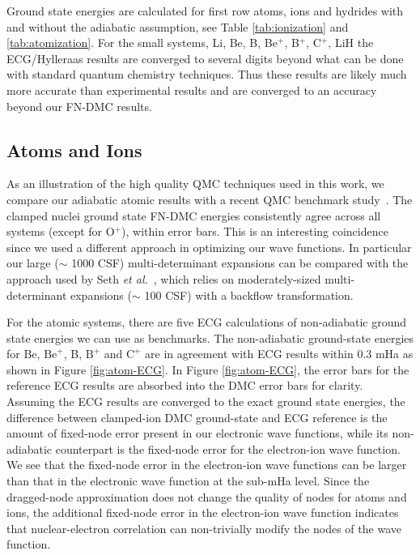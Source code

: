 \documentclass[pra,superscriptaddress,groupedaddress,twocolumn]{revtex4}
\begin{document}
Ground state energies are calculated for first row atoms, ions and hydrides with and without the adiabatic assumption, see Table \ref{tab:ionization} and \ref{tab:atomization}. For the small systems, Li, Be, B, Be$^+$, B$^+$, C$^+$, LiH the ECG/Hylleraas results are converged to several digits beyond what can be done with standard quantum chemistry techniques. Thus these results are likely much more accurate than experimental results and are converged to an accuracy beyond our FN-DMC results.

\subsection{Atoms and Ions}

As an illustration of the high quality QMC techniques used in this work, we compare our adiabatic atomic results with a recent QMC benchmark study~\cite{Seth_Bench}. The clamped nuclei ground state FN-DMC energies consistently agree across all systems (except for O$^{+}$), within error bars. This is an interesting coincidence since we used a different approach in optimizing our wave functions. In particular our large ($\sim$ 1000 CSF) multi-determinant expansions can be compared with the approach used by Seth {\it et al.}~\cite{Seth_Bench}, which relies on moderately-sized multi-determinant expansions ($\sim$ 100 CSF) with a backflow transformation. 

For the atomic systems, there are five ECG calculations of non-adiabatic ground state energies we can use as benchmarks. The non-adiabatic ground-state energies for Be, $\text{Be}^+$, B, $\text{B}^+$ and $\text{C}^+$ are in agreement with ECG results within 0.3 mHa as shown in Figure \ref{fig:atom-ECG}. In Figure \ref{fig:atom-ECG}, the error bars for the reference ECG results are absorbed into the DMC error bars for clarity. Assuming the ECG results are converged to the exact ground state energies, the difference between clamped-ion DMC ground-state and ECG reference is the amount of fixed-node error present in our electronic wave functions, while its non-adiabatic counterpart is the fixed-node error for the electron-ion wave function. We see that the fixed-node error in the electron-ion wave functions can be larger than that in the electronic wave function at the sub-mHa level. Since the dragged-node approximation does not change the quality of nodes for atoms and ions, the additional fixed-node error in the electron-ion wave function indicates that nuclear-electron correlation can non-trivially modify the nodes of the wave function.
\end{document}
